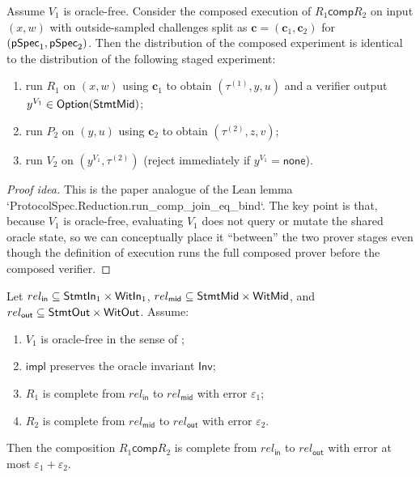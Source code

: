 \begin{lemma}
\label{lem:run_comp_decomposition}
Assume $V_1$ is oracle-free. Consider the composed execution of $R_1 \mathbin{\mathsf{comp}} R_2$ on
input $(x,w)$ with outside-sampled challenges split as $\mathbf{c}=(\mathbf{c}_1,\mathbf{c}_2)$ for
$(\mathsf{pSpec}_1,\mathsf{pSpec}_2)$. Then the distribution of the composed experiment is identical to the
distribution of the following staged experiment:
\begin{enumerate}
  \item run $R_1$ on $(x,w)$ using $\mathbf{c}_1$ to obtain $(\tau^{(1)}, y, u)$ and a verifier output
  $y^{V_1}\in\mathsf{Option}(\mathsf{StmtMid})$;
  \item run $P_2$ on $(y,u)$ using $\mathbf{c}_2$ to obtain $(\tau^{(2)}, z, v)$;
  \item run $V_2$ on $(y^{V_1},\tau^{(2)})$ (reject immediately if $y^{V_1}=\mathsf{none}$).
\end{enumerate}
\end{lemma}

\begin{proof}[Proof idea]
This is the paper analogue of the Lean lemma `ProtocolSpec.Reduction.run_comp_join_eq_bind`. The key
point is that, because $V_1$ is oracle-free, evaluating $V_1$ does not query or mutate the shared
oracle state, so we can conceptually place it ``between'' the two prover stages even though the
definition of execution runs the full composed prover before the composed verifier.
\end{proof}

\begin{theorem}
\label{thm:completeness_comp_add}
Let $rel_{\mathsf{in}} \subseteq \mathsf{StmtIn}_1\times\mathsf{WitIn}_1$, $rel_{\mathsf{mid}} \subseteq
\mathsf{StmtMid}\times\mathsf{WitMid}$, and $rel_{\mathsf{out}} \subseteq \mathsf{StmtOut}\times\mathsf{WitOut}$. Assume:
\begin{enumerate}
  \item $V_1$ is oracle-free in the sense of ;
  \item $\mathsf{impl}$ preserves the oracle invariant $\mathsf{Inv}$;
  \item $R_1$ is complete from $rel_{\mathsf{in}}$ to $rel_{\mathsf{mid}}$ with error $\varepsilon_1$;
  \item $R_2$ is complete from $rel_{\mathsf{mid}}$ to $rel_{\mathsf{out}}$ with error $\varepsilon_2$.
\end{enumerate}
Then the composition $R_1 \mathbin{\mathsf{comp}} R_2$ is complete from $rel_{\mathsf{in}}$ to
$rel_{\mathsf{out}}$ with error at most $\varepsilon_1+\varepsilon_2$.
\end{theorem}

